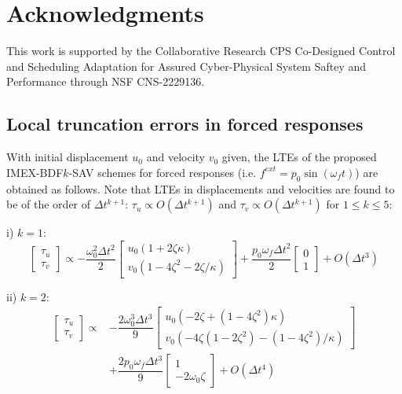 \documentclass[review]{elsarticle}
\begin{document}
\section*{Acknowledgments}
This work is supported by the Collaborative Research CPS Co-Designed Control and Scheduling Adaptation for Assured Cyber-Physical System Saftey and Performance through NSF CNS-2229136.

\begin{appendices}
\renewcommand{\theequation}{\thesection\arabic{equation}} %

\section{Local truncation errors in forced responses}
\label{ap:4thLTEforced}
With initial displacement $u_0$ and velocity $v_0$ given, the LTEs of the proposed IMEX-BDF$k$-SAV schemes for forced responses (i.e. $f^{ext}=p_0 \sin(\omega_f t)$) are obtained as follows. 
Note that LTEs in displacements and velocities are found to be of the order of $\Delta t^{k+1}$: $\tau_u \propto O(\Delta t^{k+1})$ and $\tau_v \propto O(\Delta t^{k+1})$ for $1 \le k \le 5$:

i) $k=1$:
\begin{equation}
    \begin{bmatrix}
        \tau_{u} \\ \tau_{v}
    \end{bmatrix} \propto
    -\frac{\omega_0^2\Delta t^2}{2}
    \begin{bmatrix}
        u_0 (1+2\zeta\kappa) \\
        v_0 (1-4\zeta^2-2\zeta/\kappa)
    \end{bmatrix} 
    +\frac{p_0 \omega_f \Delta t^2}{2}
    \begin{bmatrix}
        0 \\
        1
    \end{bmatrix} 
    + O(\Delta t^3)
\end{equation}

ii) $k=2$:
\begin{equation}
    \begin{array}{ll}
    \begin{bmatrix}
        \tau_{u} \\ \tau_{v}
    \end{bmatrix} \propto &
    -\dfrac{2\omega_0^3\Delta t^3}{9}
    \begin{bmatrix}
        u_0 (-2\zeta+(1-4\zeta^2)\kappa) \\
        v_0 (-4\zeta(1-2\zeta^2)-(1-4\zeta^2)/\kappa)
    \end{bmatrix} \\
    & +\dfrac{2 p_0 \omega_f \Delta t^3}{9}
    \begin{bmatrix}
        1 \\
        -2 \omega_0 \zeta
    \end{bmatrix} + O(\Delta t^4)
    \end{array}
\end{equation}


\end{appendices}
\end{document}
